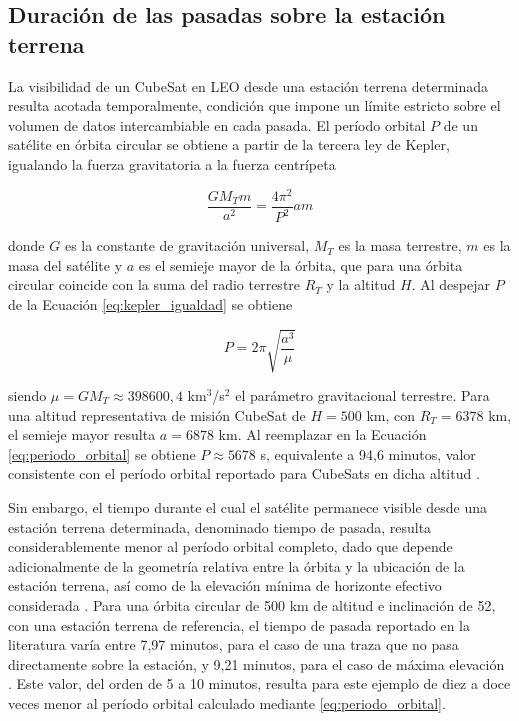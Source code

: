 \subsection{Duración de las pasadas sobre la estación terrena}
La visibilidad de un CubeSat en LEO desde una estación terrena determinada resulta acotada temporalmente, condición que impone un límite estricto sobre el volumen de datos intercambiable en cada pasada. El período orbital $P$ de un satélite en órbita circular se obtiene a partir de la tercera ley de Kepler, igualando la fuerza gravitatoria a la fuerza centrípeta

\begin{equation}
    \frac{GM_{T}m}{a^{2}} = \frac{4\pi^{2}}{P^{2}}am
    \label{eq:kepler_igualdad}
\end{equation}

donde $G$ es la constante de gravitación universal, $M_{T}$ es la masa terrestre, $m$ es la masa del satélite y $a$ es el semieje mayor de la órbita, que para una órbita circular coincide con la suma del radio terrestre $R_{T}$ y la altitud $H$. Al despejar $P$ de la Ecuación \ref{eq:kepler_igualdad} se obtiene

\begin{equation}
    P = 2\pi\sqrt{\frac{a^{3}}{\mu}}
    \label{eq:periodo_orbital}
\end{equation}

siendo $\mu = GM_{T} \approx 398600,4$ km$^{3}$/s$^{2}$ el parámetro gravitacional terrestre. Para una altitud representativa de misión CubeSat de $H=500$ km, con $R_{T}=6378$ km, el semieje mayor resulta $a=6878$ km. Al reemplazar en la Ecuación \eqref{eq:periodo_orbital} se obtiene $P\approx 5678$ s, equivalente a 94,6 minutos, valor consistente con el período orbital reportado para CubeSats en dicha altitud \cite{popescu2017}.

Sin embargo, el tiempo durante el cual el satélite permanece visible desde una estación terrena determinada, denominado tiempo de pasada, resulta considerablemente menor al período orbital completo, dado que depende adicionalmente de la geometría relativa entre la órbita y la ubicación de la estación terrena, así como de la elevación mínima de horizonte efectivo considerada \cite{popescu2017}. Para una órbita circular de 500 km de altitud e inclinación de 52\textdegree{}, con una estación terrena de referencia, el tiempo de pasada reportado en la literatura varía entre 7,97 minutos, para el caso de una traza que no pasa directamente sobre la estación, y 9,21 minutos, para el caso de máxima elevación \cite{popescu2017}. Este valor, del orden de 5 a 10 minutos, resulta para este ejemplo de diez a doce veces menor al período orbital calculado mediante \eqref{eq:periodo_orbital}.

